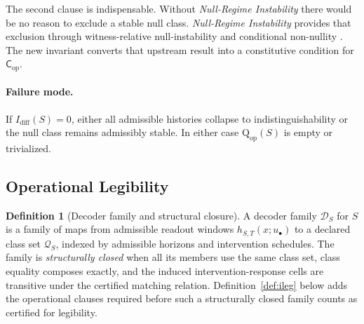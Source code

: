 \documentclass[11pt,a4paper]{article}
\theoremstyle{definition}
\newtheorem{definition}[theorem]{Definition}
\newcommand{\Cop}{\mathsf{C}_{\mathrm{op}}}
\newcommand{\Qop}{\mathrm{Q}_{\mathrm{op}}}
\newcommand{\Idiff}{I_{\mathrm{diff}}}
\newcommand{\Dec}{\mathscr{D}}
\newcommand{\Class}{\mathscr{Q}}
\begin{document}
The second clause is indispensable. Without \textit{Null-Regime Instability} there would be no reason to exclude a stable null class. \textit{Null-Regime Instability} provides that exclusion through witness-relative null-instability and conditional non-nullity \cite{paper3}. The new invariant converts that upstream result into a constitutive condition for $\Cop$.

\paragraph{Failure mode.}
If $\Idiff(S)=0$, either all admissible histories collapse to indistinguishability or the null class remains admissibly stable. In either case $\Qop(S)$ is empty or trivialized.

\subsection{Operational Legibility}\label{sec:legibility}
\begin{definition}[Decoder family and structural closure]\label{def:decoder}
A decoder family $\Dec_S$ for $S$ is a family of maps from admissible readout windows $h_{S,T}(x;u_\bullet)$ to a declared class set $\Class_S$, indexed by admissible horizons and intervention schedules. The family is \emph{structurally closed} when all its members use the same class set, class equality composes exactly, and the induced intervention-response cells are transitive under the certified matching relation. Definition~\ref{def:ileg} below adds the operational clauses required before such a structurally closed family counts as certified for legibility.
\end{definition}
\end{document}
